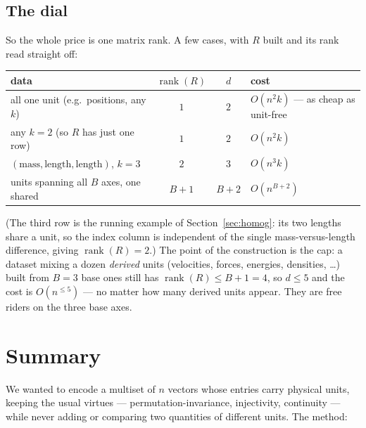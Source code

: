\documentclass[11pt,a4paper]{article}
\theoremstyle{definition}
\theoremstyle{plain}
\begin{document}
\subsection{The dial}

So the whole price is one matrix rank. A few cases, with $R$ built and its rank
read straight off:

\begin{center}
\renewcommand{\arraystretch}{1.3}
\begin{tabular}{lccl}
\hline
\textbf{data} & $\operatorname{rank}(R)$ & $d$ & \textbf{cost} \\
\hline
all one unit (e.g.\ positions, any $k$) & $1$ & $2$ & $O(n^2k)$ --- as cheap as unit-free \\
any $k=2$ (so $R$ has just one row) & $1$ & $2$ & $O(n^2k)$ \\
$(\text{mass},\text{length},\text{length})$, $k=3$ & $2$ & $3$ & $O(n^3k)$ \\
units spanning all $B$ axes, one shared & $B{+}1$ & $B{+}2$ & $O(n^{B+2})$ \\
\hline
\end{tabular}
\end{center}

\noindent
(The third row is the running example of Section~\ref{sec:homog}: its two lengths
share a unit, so the index column is independent of the single
mass-versus-length difference, giving $\operatorname{rank}(R)=2$.) The point of the
construction is the cap: a dataset mixing a dozen \emph{derived} units (velocities,
forces, energies, densities, \ldots) built from $B=3$ base ones still has
$\operatorname{rank}(R)\le B+1=4$, so $d\le5$ and the cost is $O(n^{\le5})$ --- no
matter how many derived units appear. They are free riders on the three base axes.

\section{Summary}
\label{sec:summary}

We wanted to encode a multiset of $n$ vectors whose entries carry physical units,
keeping the usual virtues --- permutation-invariance, injectivity, continuity ---
while never adding or comparing two quantities of different units. The method:
\end{document}
